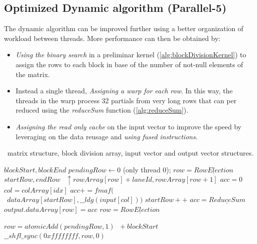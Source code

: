 \documentclass[conference]{IEEEtran}
\begin{document}
\subsection{Optimized Dynamic algorithm (Parallel-5)}
The dynamic algorithm can be improved further using a better organization of workload between threads. More performance can then be obtained by:
\begin{itemize}
    \item {\it{Using the binary search}} in a preliminar kernel (\ref{alg:blockDivisionKernel}) to assign the rows to each block in base of the number of not-null elements of the matrix.
    \item Instead a single thread, {\it{Assigning a warp for each row}}. In this way, the threads in the warp process 32 partials from very long rows that can per reduced using the {\it{reduceSum}} function (\ref{alg:reduceSum}).
    \item {\it{Assigning the read only cache}} on the input vector to improve the speed by leveraging on the data reusage and {\it{using fused instructions}}.
\end{itemize}

\begin{algorithm}[h]
\small
\caption{Optimized dynamic algorithm (Parallel-5)}
\algorithmicrequire~matrix structure, block division array, input vector and output vector structures.
\begin{algorithmic}[1]
\State $blockStart,blockEnd$ 
\State $pendingRow\leftarrow0$ \Comment(only thread 0);
\State $row=\underline{Row Election}$ 
\State $startRow,endRow$
\State $\ \ \uparrow rowArray[row]+laneId,rowArray[row+1]$
\State $acc=0$
\State $col=colArray[idx]$
\State $acc+=fmaf($
\State $\ \ dataArray[startRow],\_\_ldg(input[col]))$
\State $startRow++$
\EndWhile
\State $acc=\underline{ReduceSum}$
\State $output.dataArray[row]=acc$
\EndIf
\State $row=\underline{Row Election}$ 
\EndWhile
\EndProcedure
\end{algorithmic}
\label{alg:dynamic2}
\end{algorithm}

\begin{algorithm}[h]
\small
\caption{Row election System}
\begin{algorithmic}[1]
\State $row=atomicAdd(pendingRow,1)$
\State $\ +blockStart$
\EndIf
\State $\_\_shfl\_sync(0xffffffff,row,0)$
\EndProcedure
\end{algorithmic}
\label{alg:rowElection}
\end{algorithm}
\end{document}

